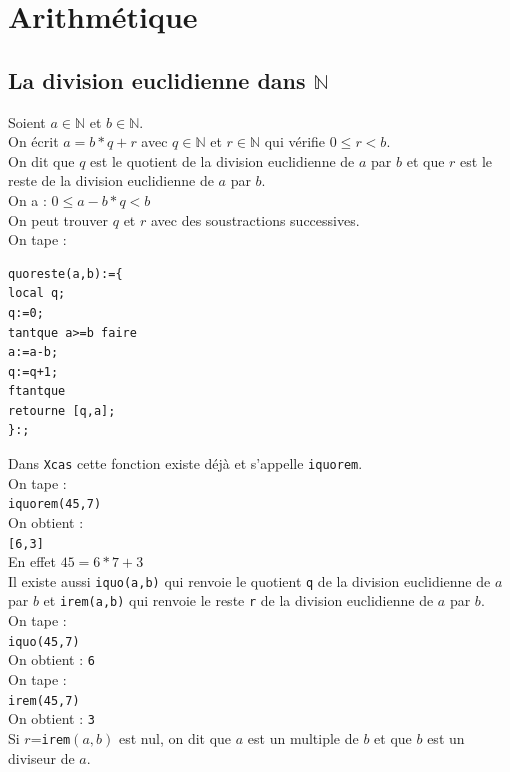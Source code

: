 \documentclass[a4paper,11pt]{book}
\newcommand{\N}{{\mathbb{N}}}
\begin{document}
\chapter{Arithm\'etique}
\section{La division euclidienne dans $\N$}
Soient $a \in \N$ et $b\in \N$.\\
On \'ecrit $a=b*q+r$ avec $q \in \N$ et $r\in \N$ qui v\'erifie $0\leq r<b$.\\
On dit que $q$ est le quotient de la division euclidienne de $a$ par $b$ et que $r$ est le reste de la division euclidienne de $a$ par $b$.\\
On a :
$0\leq a-b*q<b$\\
On peut trouver $q$ et $r$ avec des soustractions successives.\\
On tape :
\begin{verbatim}
quoreste(a,b):={
local q;
q:=0;
tantque a>=b faire 
a:=a-b;
q:=q+1;
ftantque
retourne [q,a];
}:;
\end{verbatim}
Dans {\tt Xcas} cette fonction existe d\'ej\`a et s'appelle {\tt iquorem}.\\
On tape :\\
{\tt iquorem(45,7)}\\
On obtient :\\
{\tt [6,3]}\\
En effet $45=6*7+3$\\
Il existe aussi {\tt iquo(a,b)} qui renvoie le quotient {\tt q} de la division 
euclidienne de $a$ par $b$ et {\tt irem(a,b)} qui renvoie le reste {\tt r} de 
la division euclidienne de $a$ par $b$.\\
On tape :\\
{\tt iquo(45,7)}\\
On obtient : {\tt 6}\\
On tape :\\
{\tt irem(45,7)}\\
On obtient : {\tt 3}\\
Si $r$={\tt irem}$(a,b)$ est nul, on dit que $a$ est un multiple de $b$ et que 
$b$ est un diviseur de $a$.
\end{document}
